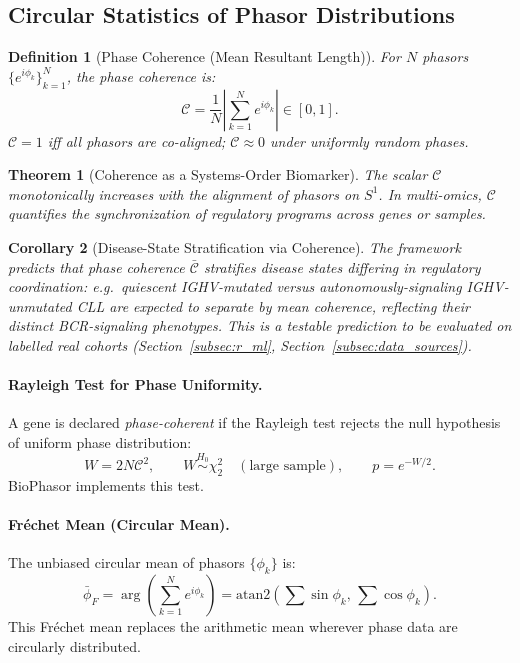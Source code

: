 \documentclass[preprint,12pt,amsmath,amssymb,superscriptaddress,floatfix]{revtex4-2}
\newtheorem{definition}{Definition}[section]
\newtheorem{theorem}{Theorem}[section]
\newtheorem{corollary}[theorem]{Corollary}
\begin{document}
\subsection{Circular Statistics of Phasor Distributions}
\label{subsec:circular_stats}

\begin{definition}[Phase Coherence (Mean Resultant Length)]
\label{def:coherence}
For $N$ phasors $\{e^{i\phi_k}\}_{k=1}^N$, the phase coherence is:
\begin{equation}
    \mathcal{C} = \frac{1}{N}\left|\sum_{k=1}^N e^{i\phi_k}\right| \in [0,1].
\end{equation}
$\mathcal{C} = 1$ iff all phasors are co-aligned;
$\mathcal{C} \approx 0$ under uniformly random phases.
\end{definition}

\begin{theorem}[Coherence as a Systems-Order Biomarker]
\label{thm:coherence}
The scalar $\mathcal{C}$ monotonically increases with the alignment of
phasors on $S^1$. In multi-omics, $\mathcal{C}$ quantifies the
synchronization of regulatory programs across genes or samples.
\end{theorem}

\begin{corollary}[Disease-State Stratification via Coherence]
\label{cor:disease}
The framework predicts that phase coherence $\bar{\mathcal{C}}$ stratifies
disease states differing in regulatory coordination: e.g.\ quiescent
IGHV-mutated versus autonomously-signaling IGHV-unmutated CLL are expected to
separate by mean coherence, reflecting their distinct BCR-signaling
phenotypes. This is a testable prediction to be evaluated on labelled real
cohorts (Section~\ref{subsec:r_ml}, Section~\ref{subsec:data_sources}).
\end{corollary}

\paragraph{Rayleigh Test for Phase Uniformity.}
A gene is declared \emph{phase-coherent} if the Rayleigh test rejects
the null hypothesis of uniform phase distribution:
\begin{equation}
    W = 2N\mathcal{C}^2, \qquad W \overset{H_0}{\sim} \chi^2_2
    \quad (\text{large sample}), \qquad p = e^{-W/2}.
\end{equation}
BioPhasor implements this test.

\paragraph{Fr\'{e}chet Mean (Circular Mean).}
The unbiased circular mean of phasors $\{\phi_k\}$ is:
\begin{equation}
    \bar{\phi}_F = \arg\left(\sum_{k=1}^N e^{i\phi_k}\right)
    = \mathrm{atan2}\!\left(\sum\sin\phi_k,\, \sum\cos\phi_k\right).
\end{equation}
This Fr\'{e}chet mean replaces the arithmetic mean wherever phase data are circularly distributed.
\end{document}
